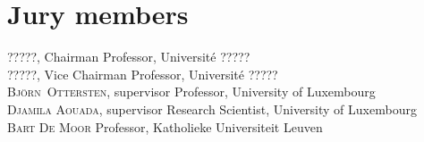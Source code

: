 
\chapter*{Jury members}


\noindent \textsc{?????}, Chairman \newline
Professor, Universit{\'e} ????? \\

\noindent \textsc{?????}, Vice Chairman \newline
Professor, Universit{\'e} ????? \\

\noindent \textsc{Bj\"orn~Ottersten}, supervisor \newline
Professor, University of Luxembourg\\

\noindent \textsc{Djamila Aouada}, supervisor \newline
Research Scientist, University of Luxembourg\\

\noindent \textsc{Bart De Moor} \newline
Professor, Katholieke Universiteit Leuven\\

